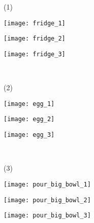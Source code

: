 \documentclass[10pt,twocolumn,letterpaper]{article}
\begin{document}
\begin{figure}[tb!]
\begin{minipage}[b]{.02\columnwidth}
  \centering
  \centerline{\small{(1)}} \smallskip
\end{minipage}
\hfill
\begin{minipage}[b]{.31\columnwidth}
  \centering
  \centerline{\texttt{[image: fridge\_1]}}
\smallskip
\end{minipage}
\hfill
\begin{minipage}[b]{.31\columnwidth}
  \centering
  \centerline{\texttt{[image: fridge\_2]}}
\smallskip
\end{minipage}
\hfill
\begin{minipage}[b]{.31\columnwidth}
  \centering
  \centerline{\texttt{[image: fridge\_3]}}
\smallskip
\end{minipage} \\
\begin{minipage}[b]{.02\columnwidth}
  \centering
  \centerline{\small{(2)}} \smallskip
\end{minipage}
\hfill
\begin{minipage}[b]{.31\columnwidth}
  \centering
  \centerline{\texttt{[image: egg\_1]}}
\smallskip
\end{minipage}
\hfill
\begin{minipage}[b]{.31\columnwidth}
  \centering
  \centerline{\texttt{[image: egg\_2]}}
\smallskip
\end{minipage}
\hfill
\begin{minipage}[b]{.31\columnwidth}
  \centering
  \centerline{\texttt{[image: egg\_3]}}
\smallskip
\end{minipage} \\
\begin{minipage}[b]{.02\columnwidth}
  \centering
  \centerline{\small{(3)}} \smallskip
\end{minipage}
\hfill
\begin{minipage}[b]{.31\columnwidth}
  \centering
  \centerline{\texttt{[image: pour\_big\_bowl\_1]}}
\smallskip
\end{minipage}
\hfill
\begin{minipage}[b]{.31\columnwidth}
  \centering
  \centerline{\texttt{[image: pour\_big\_bowl\_2]}}
\smallskip
\end{minipage}
\hfill
\begin{minipage}[b]{.31\columnwidth}
  \centering
  \centerline{\texttt{[image: pour\_big\_bowl\_3]}}

\end{minipage}
\end{figure}
\end{document}
